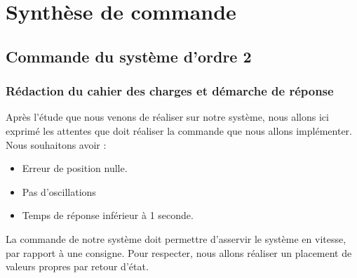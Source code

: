 \chapter{Synthèse de commande}
\label{chap:commande}
\section{Commande du système d'ordre 2}
\subsection{Rédaction du cahier des charges et démarche de réponse}
Après l'étude que nous venons de réaliser sur notre système, nous allons ici exprimé les attentes que doit réaliser la commande que nous allons implémenter. Nous souhaitons avoir : \begin{itemize} 
\item Erreur de position nulle.
\item Pas d'oscillations
\item Temps de réponse inférieur à 1 seconde.
\end{itemize}
La commande de notre système doit permettre d'asservir le système en vitesse, par rapport à une consigne. Pour respecter, nous allons réaliser un placement de valeurs propres par retour d'état.



